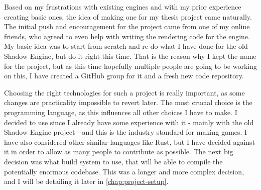 Based on my frustrations with existing engines and with my prior experience creating basic ones, the idea of making one for my thesis project came naturally.
The initial push and encouragement for the project came from one of my online friends, who agreed to even help with writing the rendering code for the engine.
My basic idea was to start from scratch and re-do what I have done for the old Shadow Engine, but do it right this time.
That is the reason why I kept the name for the project, but as this time hopefully multiple people are going to be working on this, I have created a GitHub group for it and a fresh new code repository.

Choosing the right technologies for such a project is really important, as some changes are practicality impossible to revert later.
The most crucial choice is the programming language, as this influences all other choices I have to make.
I decided to use \Cpp since I already have some experience with it - mainly with the old Shadow Engine project - and this is the industry standard for making games.
I have also considered other similar languages like Rust, but I have decided against it in order to allow as many people to contribute as possible.
The next big decision was what build system to use, that will be able to compile the potentially enormous codebase.
This was a longer and more complex decision, and I will be detailing it later in \autoref{chap:project-setup}.

